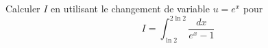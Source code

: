 Calculer $I$ en utilisant le changement de variable $u = e^x$ pour
\begin{displaymath}
 I = \int_{\ln 2}^{2\ln 2}\frac{dx}{e^x - 1}
\end{displaymath}

\bigskip